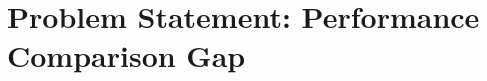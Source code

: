 \documentclass[../main.tex]{subfiles}
\begin{document}
\section{Problem Statement: Performance Comparison Gap} \label{problem_statement1}


\end{document}
